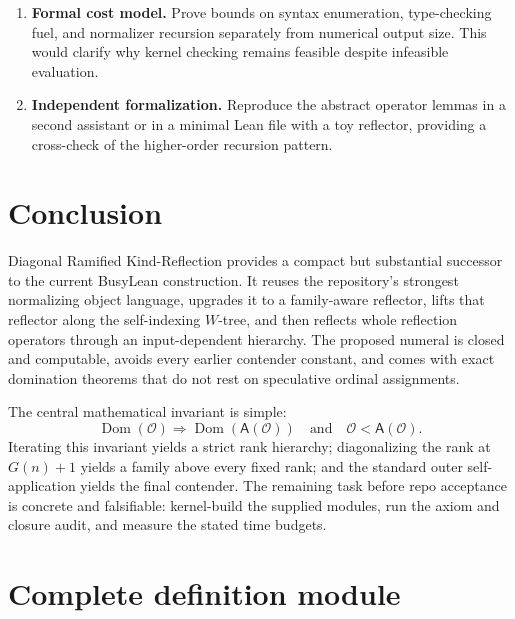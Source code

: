 \documentclass[11pt,oneside]{article}
\theoremstyle{definition}
\newcommand{\Op}{\mathcal O}
\newcommand{\Auto}{\mathsf A}
\newcommand{\code}[1]{\texttt{#1}}
\newcommand{\BusyLean}{\textsf{BusyLean}}
\begin{document}
\begin{enumerate}
        \code{lift}, \code{autonomous}, and the ramification theorems as a
        reusable module parameterized by an operator and an index path.
  \item \textbf{Formal cost model.}  Prove bounds on syntax enumeration,
        type-checking fuel, and normalizer recursion separately from numerical
        output size.  This would clarify why kernel checking remains feasible
        despite infeasible evaluation.
  \item \textbf{Independent formalization.}  Reproduce the abstract operator
        lemmas in a second assistant or in a minimal Lean file with a toy
        reflector, providing a cross-check of the higher-order recursion
        pattern.
\end{enumerate}

\section{Conclusion}

Diagonal Ramified Kind-Reflection provides a compact but substantial successor
to the current \BusyLean{} construction.  It reuses the repository's strongest
normalizing object language, upgrades it to a family-aware reflector, lifts
that reflector along the self-indexing $W$-tree, and then reflects whole
reflection operators through an input-dependent hierarchy.  The proposed
numeral is closed and computable, avoids every earlier contender constant, and
comes with exact domination theorems that do not rest on speculative ordinal
assignments.

The central mathematical invariant is simple:
\[
 \operatorname{Dom}(\Op)
 \Longrightarrow
 \operatorname{Dom}(\Auto(\Op))
 \quad\text{and}\quad
 \Op<\Auto(\Op).
\]
Iterating this invariant yields a strict rank hierarchy; diagonalizing the
rank at $G(n)+1$ yields a family above every fixed rank; and the standard outer
self-application yields the final contender.  The remaining task before repo
acceptance is concrete and falsifiable: kernel-build the supplied modules,
run the axiom and closure audit, and measure the stated time budgets.

\appendix
\section{Complete definition module}
\label{app:def-source}
\end{document}
